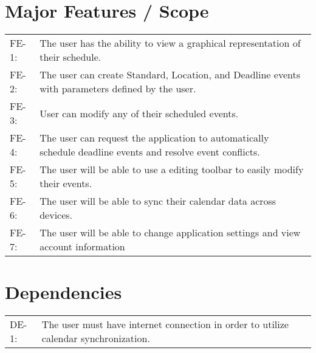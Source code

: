\documentclass{scrreprt}
\begin{document}
\section{Major Features / Scope}
\begin{center}
\begin{tabular}{  p{1cm}  p{13cm}  }
FE-1: & The user has the ability to view a graphical representation of their schedule.\\
FE-2: & The user can create Standard, Location, and Deadline events with parameters defined by the user.\\
FE-3: & User can modify any of their scheduled events.\\
FE-4: & The user can request the application to automatically schedule deadline events and resolve event conflicts.\\
FE-5: & The user will be able to use a editing toolbar to easily modify their events.\\
FE-6: & The user will be able to sync their calendar data across devices.\\
FE-7: & The user will be able to change application settings and view account information\\
\end{tabular}
\end{center}

\section{Dependencies}
\begin{center}
\begin{tabular}{  p{1cm}  p{13cm}  }
DE-1: & The user must have internet connection in order to utilize calendar synchronization.\\
\end{tabular}
\end{center}
\end{document}
